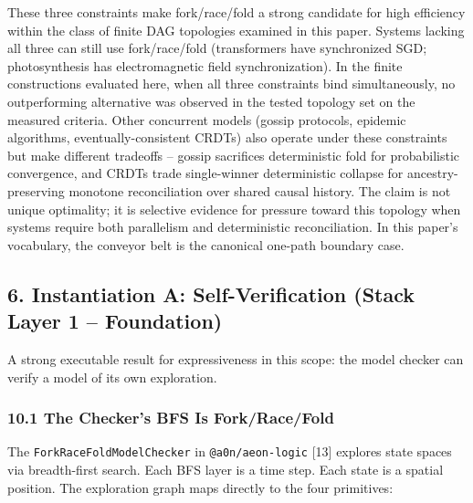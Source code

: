 \documentclass[
  11pt,
]{article}
\begin{document}
These three constraints make fork/race/fold a strong candidate for high
efficiency within the class of finite DAG topologies examined in this
paper. Systems lacking all three can still use fork/race/fold
(transformers have synchronized SGD; photosynthesis has electromagnetic
field synchronization). In the finite constructions evaluated here, when
all three constraints bind simultaneously, no outperforming alternative
was observed in the tested topology set on the measured criteria. Other
concurrent models (gossip protocols, epidemic algorithms,
eventually-consistent CRDTs) also operate under these constraints but
make different tradeoffs -- gossip sacrifices deterministic fold for
probabilistic convergence, and CRDTs trade single-winner deterministic
collapse for ancestry-preserving monotone reconciliation over shared
causal history. The claim is not unique optimality; it is selective
evidence for pressure toward this topology when systems require both
parallelism and deterministic reconciliation. In this paper's
vocabulary, the conveyor belt is the canonical one-path boundary case.

\subsection{6. Instantiation A: Self-Verification (Stack Layer 1 --
Foundation)}\label{instantiation-a-self-verification-stack-layer-1-foundation}

A strong executable result for expressiveness in this scope: the model
checker can verify a model of its own exploration.

\subsubsection{10.1 The Checker's BFS Is
Fork/Race/Fold}\label{the-checkers-bfs-is-forkracefold}

The \texttt{ForkRaceFoldModelChecker} in
\texttt{@a0n/aeon-logic} {[}13{]} explores state spaces via
breadth-first search. Each BFS layer is a time step. Each state is a
spatial position. The exploration graph maps directly to the four
primitives:
\end{document}
